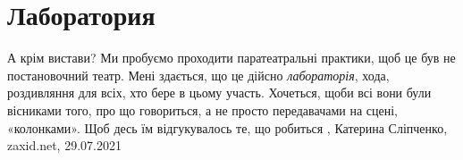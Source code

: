  
 
 
 
 
\chapter{Лаборатория}

А крім вистави?  Ми пробуємо проходити паратеатральні практики, щоб це був не постановочний
театр. Мені здається, що це дійсно \emph{лабораторія}, хода, роздивляння для всіх, хто
бере в цьому участь. Хочеться, щоби всі вони були вісниками того, про що
говориться, а не просто передавачами на сцені, «колонками». Щоб десь їм
відгукувалось те, що робиться
, 
Катерина Сліпченко, zaxid.net, 29.07.2021

